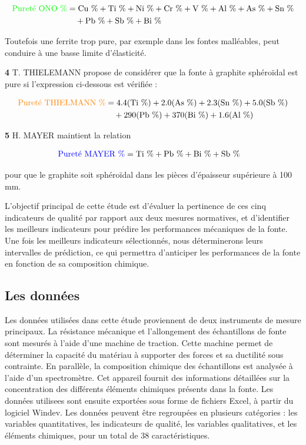 \documentclass[12pt]{article}
\begin{document}
\begin{align*}
    \textcolor{green}{\text{Pureté ONO \%}} &= \text{Cu \%} + \text{Ti \%} + \text{Ni \%} + \text{Cr \%} + \text{V \%} + \text{Al \%} + \text{As \%} + \text{Sn \%} \\
    &\quad + \text{Pb \%} + \text{Sb \%} + \text{Bi \%}
\end{align*}

Toutefois une ferrite trop pure, par exemple dans les fontes malléables, 
peut conduire à une basse limite d'élasticité.



\textbf{4} T. THIELEMANN propose de considérer que la fonte à graphite 
sphéroïdal est pure si l'expression ci-dessous est vérifiée :

\begin{align*}
    \textcolor{orange}{\text{Pureté THIELMANN \%}} &= 4.4 (\text{Ti \%}) + 2.0 (\text{As \%}) + 2.3 (\text{Sn \%}) + 5.0 (\text{Sb \%}) \\
    &\quad + 290 (\text{Pb \%}) + 370 (\text{Bi \%}) + 1.6 (\text{Al \%})
\end{align*}


\textbf{5} H. MAYER maintient la relation

\begin{align*}
    \textcolor{blue}{\text{Pureté MAYER \%}} &= \text{Ti \%} + \text{Pb \%} + \text{Bi \%} + \text{Sb \%}
\end{align*}

pour que le graphite soit sphéroïdal dans les pièces d’épaisseur supérieure
à 100 mm.


L'objectif principal de cette étude est d'évaluer la pertinence de ces 
cinq indicateurs de qualité par rapport aux deux mesures normatives, et 
d'identifier les meilleurs indicateurs pour prédire les performances 
mécaniques de la fonte. Une fois les meilleurs indicateurs sélectionnés, 
nous déterminerons leurs intervalles de prédiction, ce qui permettra 
d'anticiper les performances de la fonte en fonction de sa composition 
chimique.


\newpage

\subsection{Les données}

Les données utilisées dans cette étude proviennent de deux instruments 
de mesure principaux. La résistance mécanique et l'allongement des 
échantillons de fonte sont mesurés à l'aide d'une machine de traction. 
Cette machine permet de déterminer la capacité du matériau à supporter 
des forces et sa ductilité sous contrainte. En parallèle, la composition chimique des échantillons est analysée à 
l'aide d'un spectromètre. Cet appareil fournit des informations détaillées 
sur la concentration des différents éléments chimiques présents dans la 
fonte. Les données utilisees sont ensuite exportées sous forme de fichiers 
Excel, à partir du logiciel Windev. Les données peuvent être regroupées 
en plusieurs catégories : les variables quantitatives, les indicateurs 
de qualité, les variables qualitatives, et les éléments chimiques, pour 
un total de 38 caractéristiques.
\end{document}
